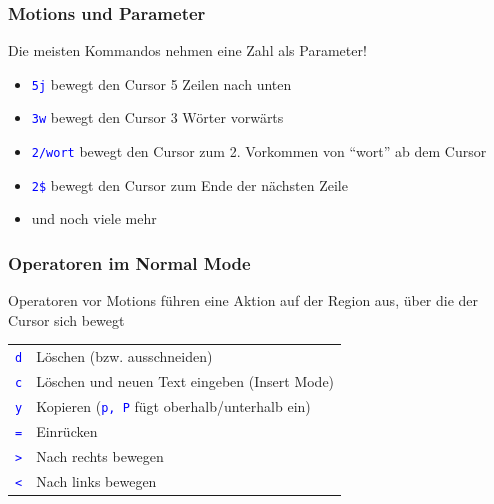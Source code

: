 \documentclass{beamer}
\newcommand{\cmd}[1]{\textcolor{blue}{\texttt{#1}}}
\begin{document}
\begin{frame}
  \frametitle{Motions und Parameter}
  Die meisten Kommandos nehmen eine Zahl als Parameter! \\[0.3cm]

  \begin{itemize}
    \item \cmd{5j} bewegt den Cursor 5 Zeilen nach unten \\[0.3cm]
    \item \cmd{3w} bewegt den Cursor 3 Wörter vorwärts \\[0.3cm]
    \item \cmd{2/wort} bewegt den Cursor zum 2. Vorkommen von \enquote{wort} ab dem Cursor \\[0.3cm]
    \item \cmd{2\$} bewegt den Cursor zum Ende der nächsten Zeile \\[0.3cm]
    \item und noch viele mehr
  \end{itemize}
\end{frame}

\begin{frame}
  \frametitle{Operatoren im Normal Mode}
  Operatoren vor Motions führen eine Aktion auf der Region aus, über die der Cursor sich bewegt \\[0.5cm]

  \begin{tabular}{l | l}
    \cmd{d} & Löschen (bzw. ausschneiden) \\[0.2cm]
    \cmd{c} & Löschen und neuen Text eingeben (Insert Mode) \\[0.2cm]
    \cmd{y} & Kopieren (\cmd{p, P} fügt oberhalb/unterhalb ein) \\[0.2cm]
    \cmd{=} & Einrücken \\[0.2cm]
    \cmd{>} & Nach rechts bewegen \\[0.2cm]
    \cmd{<} & Nach links bewegen
  \end{tabular}
\end{frame}
\end{document}
